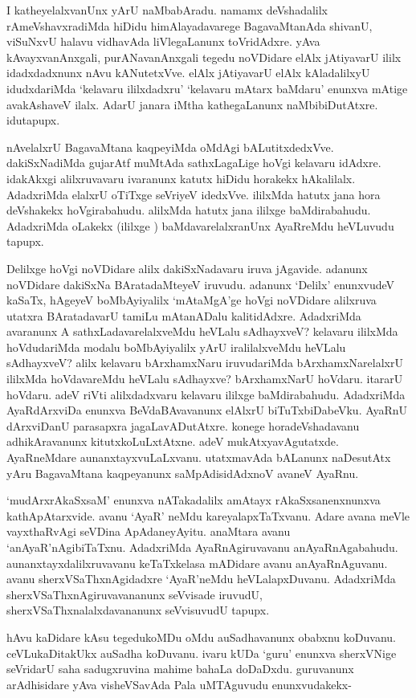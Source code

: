 I katheyelalxvanUnx yArU naMbabAradu. namamx deVshadalilx rAmeVshavxradiMda hiDidu himAlayadavarege BagavaMtanAda shivanU, viSuNxvU halavu vidhavAda liVlegaLanunx toVridAdxre. yAva kAvayxvanAnxgali, purANavanAnxgali tegedu noVDidare elAlx jAtiyavarU ililx idadxdadxnunx nAvu kANutetxVve. elAlx jAtiyavarU elAlx kAladalilxyU idudxdariMda `kelavaru ililxdadxru' `kelavaru mAtarx baMdaru' enunxva mAtige avakAshaveV ilalx. AdarU janara iMtha kathegaLanunx naMbibiDutAtxre. idutapupx. 

nAvelalxrU BagavaMtana kaqpeyiMda oMdAgi bALutitxdedxVve. dakiSxNadiMda gujarAtf muMtAda sathxLagaLige hoVgi kelavaru idAdxre. idakAkxgi alilxruvavaru ivaranunx katutx hiDidu horakekx hAkalilalx. AdadxriMda elalxrU oTiTxge seVriyeV idedxVve. ililxMda hatutx jana hora deVshakekx hoVgirabahudu. alilxMda hatutx jana ililxge baMdirabahudu. AdadxriMda oLakekx (ililxge ) baMdavarelalxranUnx AyaRreMdu heVLuvudu tapupx. 

Delilxge hoVgi noVDidare alilx dakiSxNadavaru iruva jAgavide. adanunx noVDidare dakiSxNa BAratadaMteyeV iruvudu. adanunx `Delilx' enunxvudeV kaSaTx, hAgeyeV boMbAyiyalilx `mAtaMgA'ge hoVgi noVDidare alilxruva utatxra BAratadavarU tamiLu mAtanADalu kalitidAdxre. AdadxriMda avaranunx A sathxLadavarelalxveMdu heVLalu sAdhayxveV? kelavaru ililxMda hoVdudariMda modalu boMbAyiyalilx yArU iralilalxveMdu heVLalu sAdhayxveV? alilx kelavaru bArxhamxNaru iruvudariMda bArxhamxNarelalxrU ililxMda hoVdavareMdu heVLalu sAdhayxve? bArxhamxNarU hoVdaru. itararU hoVdaru. adeV riVti alilxdadxvaru kelavaru ililxge baMdirabahudu. AdadxriMda AyaRdArxviDa enunxva BeVdaBAvavanunx elAlxrU biTuTxbiDabeVku. AyaRnU dArxviDanU parasapxra jagaLavADutAtxre. konege horadeVshadavanu adhikAravanunx kitutxkoLuLxtAtxne. adeV mukAtxyavAgutatxde. AyaRneMdare aunanxtayxvuLaLxvanu. utatxmavAda bALanunx naDesutAtx yAru BagavaMtana kaqpeyanunx saMpAdisidAdxnoV avaneV AyaRnu. 

`mudArxrAkaSxsaM' enunxva nATakadalilx amAtayx rAkaSxsanenxnunxva kathApAtarxvide. avanu `AyaR' neMdu kareyalapxTaTxvanu. Adare avana meVle vayxthaRvAgi seVDina ApAdaneyAyitu. anaMtara avanu `anAyaR'nAgibiTaTxnu. AdadxriMda AyaRnAgiruvavanu anAyaRnAgabahudu. aunanxtayxdalilxruvavanu keTaTxkelasa mADidare avanu anAyaRnAguvanu. avanu sherxVSaThxnAgidadxre `AyaR'neMdu heVLalapxDuvanu. AdadxriMda sherxVSaThxnAgiruvavananunx seVvisade iruvudU, sherxVSaThxnalalxdavananunx seVvisuvudU tapupx. 

hAvu kaDidare kAsu tegedukoMDu oMdu auSadhavanunx obabxnu koDuvanu. ceVLukaDitakUkx auSadha koDuvanu. ivaru kUDa `guru' enunxva sherxVNige seVridarU saha sadugxruvina mahime bahaLa doDaDxdu. guruvanunx arAdhisidare yAva visheVSavAda Pala uMTAguvudu enunxvudakekx-

